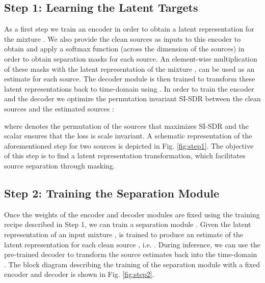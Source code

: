 \documentclass{article}
\begin{document}
\subsection{Step 1: Learning the Latent Targets}
\label{sec:method:step1}
As a first step we train an encoder  in order to obtain a latent representation for the mixture . We also provide the clean sources as inputs to this encoder to obtain  and apply a softmax function (across the dimension of the sources) in order to obtain separation masks  for each source. An element-wise multiplication of these masks with the latent representation of the mixture  , can be used as an estimate for each source. The decoder module  is then trained to transform these latent representations back to time-domain using . In order to train the encoder and the decoder we optimize the permutation invariant \cite{Yu2017PIT} SI-SDR \cite{le2019sdr} between the clean sources  and the estimated sources :

where  denotes the permutation of the sources that maximizes SI-SDR and the scalar  ensures that the loss is scale invariant. A schematic representation of the aforementioned step for two sources is depicted in Fig. \ref{fig:step1}. The objective of this step is to find a latent representation transformation, which facilitates source separation through masking.
\subsection{Step 2: Training the Separation Module}
\label{sec:method:step2}
Once the weights of the encoder and decoder modules are fixed using the training recipe described in Step 1, we can train a separation module . Given the latent representation of an input mixture ,  is trained to produce an estimate of the latent representation  for each clean source , i.e. . During inference, we can use the pre-trained decoder to transform the source estimates back into the time-domain . The block diagram describing the training of the separation module with a fixed encoder and decoder is shown in Fig. \ref{fig:step2}.
\end{document}
